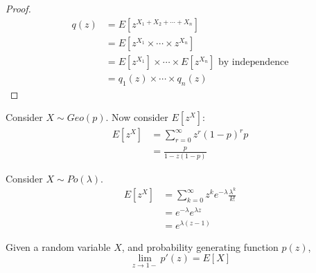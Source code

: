 \documentclass[../Main.tex]{subfiles}
\begin{document}
\begin{proof}
    \begin{align*}
        q(z) &= E[z^{X_1 + X_2 + \cdots + X_n}] \\
        &= E[z^{X_1} \times \cdots \times z^{X_n}] \\
        &= E[z^{X_1}] \times \cdots \times E[z^{X_n}] \text{ by independence} \\
        &= q_1(z) \times \cdots \times q_n(z)
    \end{align*}
\end{proof}
\begin{example}
    Consider $X \sim Geo(p)$. Now consider $E[z^X]$:
    \begin{align*}
        E[z^X] &= \sum_{r=0}^\infty z^r (1-p)^r p \\
        &= \frac{p}{1-z(1-p)}
    \end{align*}
\end{example}
\begin{example}
    Consider $X \sim Po(\lambda)$.
    \begin{align*}
        E[z^X] &= \sum_{k=0}^\infty z^k e^{-\lambda} \frac{\lambda^k}{k!} \\
        &= e^{-\lambda} e^{\lambda z} \\
        &= e^{\lambda (z-1)}
    \end{align*}
\end{example}
\begin{theorem}
    Given a random variable $X$, and probability generating function $p(z)$,
    \begin{equation*}
        \lim_{z \to 1-} p'(z) = E[X]
    \end{equation*}
\end{theorem}
\end{document}
